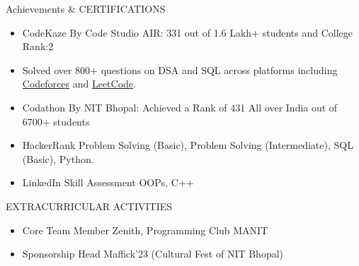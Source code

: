\documentclass{resume} %
\begin{document}
\begin{rSection}{Achievements \& CERTIFICATIONS } 
\begin{itemize}
\vspace{-0.5mm}
    \item 	CodeKaze By Code Studio AIR: 331 out of 1.6 Lakh+ students and College Rank:2 
   \vspace{-2mm}
    \item	Solved over 800+ questions on DSA and SQL across platforms including \href{https://codeforces.com/profile/Bornconfusde_}{Codeforces} and
    \href{https://leetcode.com/u/bornconfusde/}{LeetCode}.
     \vspace{-2mm}
    \item Codathon By NIT Bhopal: Achieved a Rank of 431 All over India out of 6700+ students 
    \vspace{-2mm}
       \item HackerRank Problem Solving (Basic), Problem Solving (Intermediate), SQL (Basic), Python.
       \vspace{-2mm}
\item LinkedIn Skill Assessment OOPs, C++ 
\end{itemize}


\end{rSection}
   \vspace{-3mm}
\begin{rSection}{EXTRACURRICULAR ACTIVITIES} 
\begin{itemize}
 \vspace{-0.5mm}
 \item Core Team Member Zenith, Programming Club MANIT
 \vspace{-2mm} 
 \item Sponsorship Head Maffick'23 (Cultural Fest of NIT Bhopal)
\end{itemize}


\end{rSection}
\end{document}
